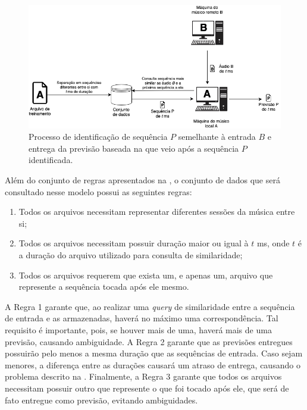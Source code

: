 \begin{figure}[htbp]
    \centering
    \includegraphics[width=1\textwidth]{images/index-model.png}
    \caption{Processo de identificação de sequência $P$ semelhante à entrada $B$ e entrega da previsão baseada na que veio após a sequência $P$ identificada.}
    \label{fig:indexative_model}
\end{figure}

Além do conjunto de regras apresentados na , o conjunto de dados que será consultado nesse modelo possui as seguintes regras:

\begin{enumerate}
    \item Todos os arquivos necessitam representar diferentes sessões da música entre si;
    \item Todos os arquivos necessitam possuir duração maior ou igual à $t$ ms, onde $t$ é a duração do arquivo utilizado para consulta de similaridade;
    \item Todos os arquivos requerem que exista um, e apenas um, arquivo que represente a sequência tocada após ele mesmo.
\end{enumerate}

A Regra 1 garante que, ao realizar uma \textit{query} de similaridade entre a sequência de entrada e as armazenadas, haverá no máximo uma correspondência. Tal requisito é importante, pois, se houver mais de uma, haverá mais de uma previsão, causando ambiguidade. A Regra 2 garante que as previsões entregues possuirão pelo menos a mesma duração que as sequências de entrada. Caso sejam menores, a diferença entre as durações causará um atraso de entrega, causando o problema descrito na . Finalmente, a Regra 3 garante que todos os arquivos necessitam possuir outro que represente o que foi tocado após ele, que será de fato entregue como previsão, evitando ambiguidades.

